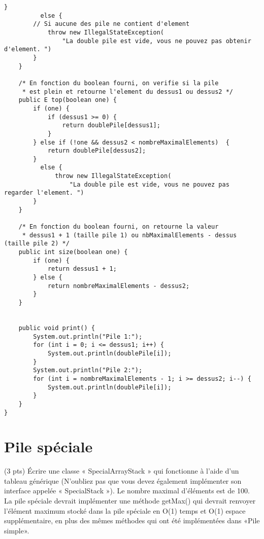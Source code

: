 \documentclass[9pt]{report}
\begin{document}
\begin{lstlisting}[style=JavaDraculaWhite]
        }
          else {
        // Si aucune des pile ne contient d'element 
            throw new IllegalStateException(
                "La double pile est vide, vous ne pouvez pas obtenir d'element. ")
        }
    }

    /* En fonction du boolean fourni, on verifie si la pile 
     * est plein et retourne l'element du dessus1 ou dessus2 */
    public E top(boolean one) {
        if (one) {
            if (dessus1 >= 0) {
                return doublePile[dessus1];
            }
        } else if (!one && dessus2 < nombreMaximalElements)  {
            return doublePile[dessus2];
        }
          else {
              throw new IllegalStateException(
                  "La double pile est vide, vous ne pouvez pas regarder l'element. ")
        }
    }
    
    /* En fonction du boolean fourni, on retourne la valeur   
     * dessus1 + 1 (taille pile 1) ou nbMaximalElements - dessus (taille pile 2) */
    public int size(boolean one) {
        if (one) {
            return dessus1 + 1;
        } else {
            return nombreMaximalElements - dessus2;
        }
    }


    public void print() {
        System.out.println("Pile 1:");
        for (int i = 0; i <= dessus1; i++) {
            System.out.println(doublePile[i]);
        }
        System.out.println("Pile 2:");
        for (int i = nombreMaximalElements - 1; i >= dessus2; i--) {
            System.out.println(doublePile[i]);
        }
    }
}
    \end{lstlisting}

    \chapter{Pile spéciale}

    \begin{Exercice}{(3 pts)}{}
      Écrire une classe « SpecialArrayStack » qui fonctionne à l'aide 
      d'un tableau générique (N’oubliez pas que
      vous devez également implémenter son interface appelée « SpecialStack »).
      Le nombre maximal d’éléments est de 100. La pile spéciale devrait 
      implémenter une méthode getMax() qui devrait renvoyer
      l’élément maximum stocké dans la pile spéciale en O(1) temps et 
      O(1) espace supplémentaire, en plus des
      mêmes méthodes qui ont été implémentées dans «Pile simple».
    \end{Exercice}
\end{document}
